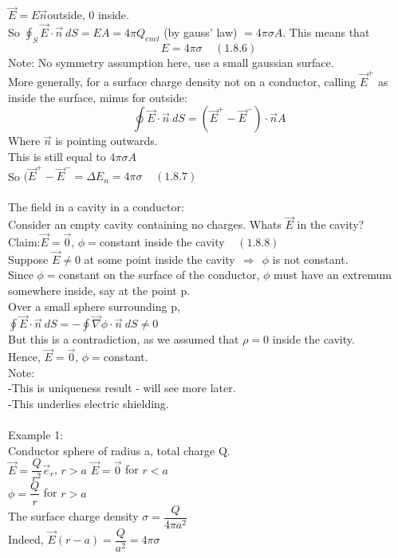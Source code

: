 \documentclass[a4paper,11pt]{article}
\newcommand{\Nab}{\vec{\nabla}}
\newcommand{\dop}[2]{\vec{#1}\cdot\vec{#2}}
\begin{document}
$\vec{E}=E\vec{n}$outside, 0 inside.\\
So $\oint_S \vec{E}\cdot\vec{n}~dS=EA=4\pi Q_{encl}$ (by gauss' law) $=4\pi\sigma A$. This means that 
$$E=4\pi \sigma~~~~~(1.8.6)$$
Note: No symmetry assumption here, use a small gaussian surface.\\
More generally, for a surface charge density not on a conductor, calling $\vec{E}^{+}$ as inside the surface, minus for outside:\\
$$\oint\dop{E}{n}~dS=(\vec{E}^{+}-\vec{E}^{-})\cdot \vec{n} A$$
Where $\vec{n}$ is pointing outwards.\\
This is still equal to $4\pi\sigma A$\\
So $(\vec{E}^{+}-\vec{E}^{-}=\Delta E_n=4\pi\sigma~~~~~(1.8.7)$\\
\\
The field in a cavity in a conductor:\\
Consider an empty cavity containing no charges. Whats $\vec{E}$ in the cavity?\\
Claim:$\vec{E}=\vec{0}$, $\phi=$constant inside the cavity$~~~~~(1.8.8)$\\
Suppose $\vec{E}\neq 0$ at some point inside the cavity$~~\Rightarrow~~\phi$ is not constant.\\
Since $\phi=$constant on the surface of the conductor, $\phi$ must have an extremum somewhere inside, say at the point p.\\
Over a small sphere surrounding p,\\
$\oint \vec{E}\cdot\vec{n}~dS=-\oint\Nab\phi\cdot\vec{n}~dS\neq 0$\\
But this is a contradiction, as we assumed that $\rho=0$ inside the cavity.\\
Hence, $\vec{E}=\vec{0}$, $\phi=$constant.\\
Note:\\
-This is uniqueness result - will see more later.\\
-This underlies electric shielding.\\
\\
Example 1:\\
Conductor sphere of radius a, total charge Q.\\
$\vec{E}=\dfrac{Q}{r^2}\vec{e}_r$, $r>a$
$\vec{E}=\vec{0}$ for $r<a$\\
$\phi=\dfrac{Q}{r}$ for $r>a$\\
The surface charge density $\sigma=\dfrac{Q}{4\pi a^2}$\\
Indeed, $\vec{E}(r-a)=\dfrac{Q}{a^2}=4\pi\sigma$\\
\end{document}
